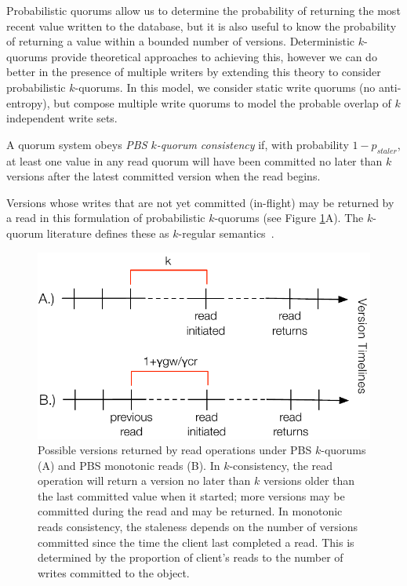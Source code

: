 \documentclass{vldb}
\begin{document}
Probabilistic quorums allow us to determine the probability of
returning the most recent value written to the database, but it is
also useful to know the probability of returning a value within a
bounded number of versions.  Deterministic $k$-quorums provide
theoretical approaches to achieving this, however we can do better in
the presence of multiple writers by extending this theory to consider
probabilistic $k$-quorums.  In this model, we consider static write
quorums (no anti-entropy), but compose multiple write quorums to model the probable overlap of $k$ independent write sets.
\begin{definition}
A quorum system obeys \textit{PBS $k$-quorum consistency} if, with
probability $1-p_{staler}$, at least one value in any read quorum will
have been committed no later than $k$ versions after the latest committed
version when the read begins.
\end{definition}
Versions whose writes that are not yet committed (in-flight) may be
returned by a read in this formulation of probabilistic $k$-quorums
(see Figure \ref{fig:timelines}A).  The $k$-quorum literature defines these as $k$-regular semantics~\cite{nonstrict-availability}.

\begin{figure}
\centering
\includegraphics[width=\columnwidth]{figs/timelines.pdf}
\caption{Possible versions returned by read operations under
  PBS $k$-quorums (A) and PBS monotonic reads (B). In
  $k$-consistency, the read operation will return a version no later
  than $k$ versions older than the last committed value when it
  started; more versions may be committed during the read and may be
  returned.  In monotonic reads consistency, the staleness depends on
  the number of versions committed since the time the client last
  completed a read.  This is determined by the proportion of client's
  reads to the number of writes committed to the object.}
\label{fig:timelines}
\end{figure}
\end{document}
